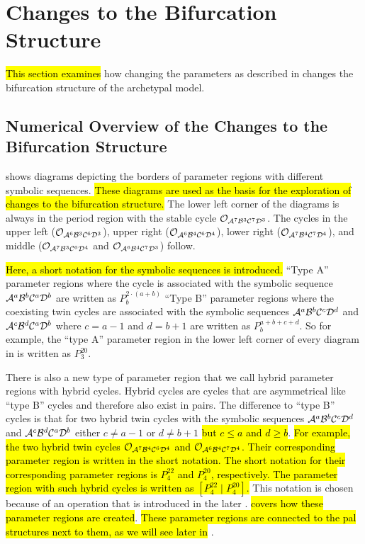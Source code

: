 \section{Changes to the Bifurcation Structure}
\label{sec:add.change}

\hl{This section examines} how changing the parameters as described in  changes the bifurcation structure of the archetypal model.

\subsection{Numerical Overview of the Changes to the Bifurcation Structure}
\label{sec:add.change.num}

 shows diagrams depicting the borders of parameter regions with different symbolic sequences.
\hl{
	These diagrams are used as the basis for the exploration of changes to the bifurcation structure.
}
The lower left corner of the diagrams is always in the period region with the stable cycle $\mathcal{O}_{\mathcal{A}^7\mathcal{B}^3\mathcal{C}^7\mathcal{D}^3}$.
The cycles in the upper left ($\mathcal{O}_{\mathcal{A}^6\mathcal{B}^3\mathcal{C}^6\mathcal{D}^3}$), upper right ($\mathcal{O}_{\mathcal{A}^6\mathcal{B}^4\mathcal{C}^6\mathcal{D}^4}$), lower right ($\mathcal{O}_{\mathcal{A}^7\mathcal{B}^4\mathcal{C}^7\mathcal{D}^4}$), and middle ($\mathcal{O}_{\mathcal{A}^7\mathcal{B}^3\mathcal{C}^6\mathcal{D}^4}$ and $\mathcal{O}_{\mathcal{A}^6\mathcal{B}^4\mathcal{C}^7\mathcal{D}^3}$) follow.

\hl{
	Here, a short notation for the symbolic sequences is introduced.
}
``Type A'' parameter regions where the cycle is associated with the symbolic sequence $\mathcal{A}^a\mathcal{B}^b\mathcal{C}^a\mathcal{D}^b$ are written as $P^{2 \cdot \left(a + b\right)}_b$
``Type B'' parameter regions where the coexisting twin cycles are associated with the symbolic sequences $\mathcal{A}^a\mathcal{B}^b\mathcal{C}^c\mathcal{D}^d$ and $\mathcal{A}^c\mathcal{B}^d\mathcal{C}^a\mathcal{D}^b$ where $c = a - 1$ and $d = b + 1$ are written as $P^{a + b + c + d}_b$.
So for example, the ``type A'' parameter region in the lower left corner of every diagram in  is written as $P^{20}_3$.

There is also a new type of parameter region that we call hybrid parameter regions with hybrid cycles.
Hybrid cycles are cycles that are asymmetrical like ``type B'' cycles and therefore also exist in pairs.
The difference to ``type B'' cycles is that for two hybrid twin cycles with the symbolic sequences $\mathcal{A}^a\mathcal{B}^b\mathcal{C}^c\mathcal{D}^d$ and $\mathcal{A}^c\mathcal{B}^d\mathcal{C}^a\mathcal{D}^b$ either $c \neq a - 1$ or $d \neq b + 1$ \hl{but $c \leq a$ and $d \geq b$}.
\hl{
	For example, the two hybrid twin cycles $\mathcal{O}_{\mathcal{A}^7\mathcal{B}^4\mathcal{C}^6\mathcal{D}^4}$ and $\mathcal{O}_{\mathcal{A}^6\mathcal{B}^4\mathcal{C}^7\mathcal{D}^4}$.
	Their corresponding parameter region is written  in the short notation.
	The short notation for their corresponding parameter regions is $P^{22}_4$ and $P^{20}_4$, respectively.
	The parameter region with such hybrid cycles is written as $\left[P^{22}_4 \mid P^{20}_4\right]$.
}
This notation is chosen because of an operation that is introduced in the later .
 \hl{covers how these parameter regions are created}.
\hl{These parameter regions are connected to the \gls{pal} structures next to them, as we will see later in} .

